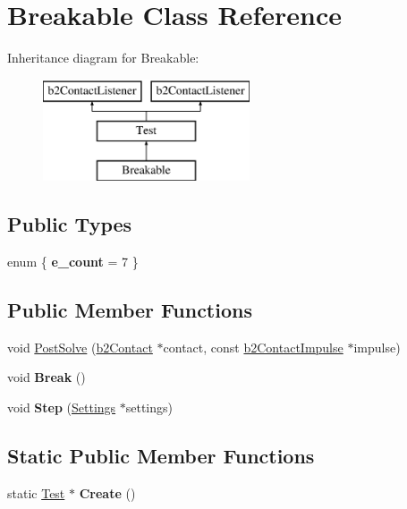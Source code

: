 \hypertarget{class_breakable}{\section{Breakable Class Reference}
\label{class_breakable}
}
Inheritance diagram for Breakable\-:\begin{figure}[H]
\begin{center}
\leavevmode
\includegraphics[height=3.000000cm]{class_breakable}
\end{center}
\end{figure}
\subsection*{Public Types}
\begin{DoxyCompactItemize}
\item 
enum \{ {\bfseries e\-\_\-count} =  7
 \}
\end{DoxyCompactItemize}
\subsection*{Public Member Functions}
\begin{DoxyCompactItemize}
\item 
void \hyperlink{class_breakable_a357879fafdb8a0dec8684bff61bf0dfd}{Post\-Solve} (\hyperlink{classb2_contact}{b2\-Contact} $\ast$contact, const \hyperlink{structb2_contact_impulse}{b2\-Contact\-Impulse} $\ast$impulse)
\item 
\hypertarget{class_breakable_a7e4e124f5b4537f60ea5fbd7cb4f5251}{void {\bfseries Break} ()}\label{class_breakable_a7e4e124f5b4537f60ea5fbd7cb4f5251}

\item 
\hypertarget{class_breakable_aacddbc8ed4e0bb5ce9e69a34cd0a74a6}{void {\bfseries Step} (\hyperlink{struct_settings}{Settings} $\ast$settings)}\label{class_breakable_aacddbc8ed4e0bb5ce9e69a34cd0a74a6}

\end{DoxyCompactItemize}
\subsection*{Static Public Member Functions}
\begin{DoxyCompactItemize}
\item 
\hypertarget{class_breakable_a5c3ef04b9cfcc3f86ab6da7e8f6ee993}{static \hyperlink{class_test}{Test} $\ast$ {\bfseries Create} ()}\label{class_breakable_a5c3ef04b9cfcc3f86ab6da7e8f6ee993}

\end{DoxyCompactItemize}
